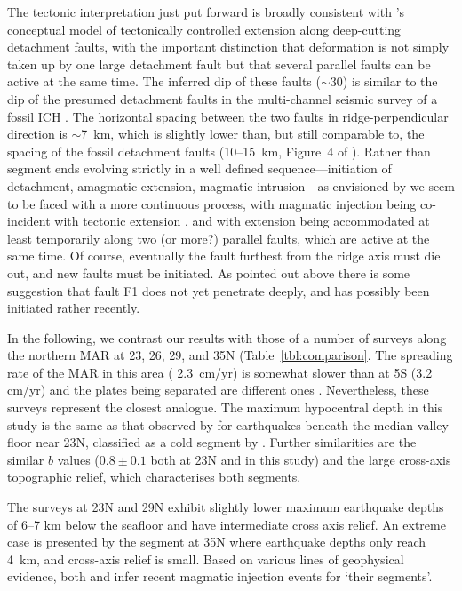 \documentclass[jgr]{agu2001}
\newlength{\tw}
\begin{document}
\begin{article}
The tectonic interpretation just put forward is broadly consistent
with \citeauthor{tucholke94}'s conceptual
model of tectonically controlled extension along deep-cutting
detachment faults, with the important distinction that deformation is
not simply taken up by one large detachment fault but that several
parallel faults can be active at the same time.  The inferred dip of
these faults ($\sim$30\dg) is similar to the dip of the presumed
detachment faults in the multi-channel seismic survey of a fossil ICH
\citep{ranero99}.  The horizontal spacing between the two faults in
ridge-perpendicular direction is $\sim$7~km, which is slightly lower
than, but still comparable to, the spacing of the fossil detachment
faults (10--15~km, Figure~4 of \citet{ranero99}).  Rather than segment
ends evolving strictly in a well defined sequence---initiation of
detachment, amagmatic extension, magmatic intrusion---as envisioned by
\citet{tucholke94} we seem to be faced with a more continuous process,
with magmatic injection being co-incident with tectonic extension
\citep{reston02}, and with extension being accommodated at least
temporarily along two (or more?) parallel faults, which are
active at the same time.  
Of course, eventually the fault furthest
from the ridge axis must die out, and new faults must be
initiated. As pointed out above there is some suggestion that fault
F1 does not yet penetrate deeply, and has possibly been initiated
rather recently.

In the following, we contrast our results with those of a number of
surveys along the northern MAR at 23\dg, 26\dg, 29\dg,  and 35\dg N (Table~\ref{tbl:comparison}.  The spreading
rate of the MAR in this area ( 2.3~cm/yr) is somewhat slower than
at 5\dg S (3.2 cm/yr) and the plates being separated are different
ones \citep{demets94}.
Nevertheless, these surveys represent the closest analogue.
The maximum hypocentral depth in this study is the same as that
observed by \citet{toomey88} for earthquakes beneath the median valley
floor near 23\dg N, classified as a cold segment by \citep{thibaud98}. Further similarities are the
similar $b$ values ($0.8\pm0.1$ both at 23\dg N and in this
study) and the large cross-axis topographic relief, which
characterises both segments.

The surveys at 23\dg N \citep{kong92} and 29\dg N \citep{wolfe95}
exhibit slightly lower maximum earthquake depths of 6--7 km below the
seafloor and have intermediate cross axis relief.  An extreme case is
presented by the segment at 35\dg N \citep{barclay01} where earthquake
depths only reach 4~km, and cross-axis relief is small.  Based on
various lines of geophysical evidence, both
\citet{kong92} and \citet{barclay01} infer recent magmatic injection
events for `their segments'.


\end{article}
\end{document}
